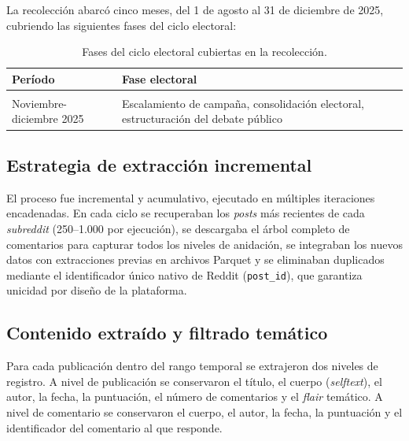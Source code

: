 \documentclass[
  letterpaper,
  numbers=noendperiod,
  fontsize=11pt,
  DIV=12,
  titlepage=false]{scrreprt}
\begin{document}
La recolección abarcó cinco meses, del 1 de agosto al 31 de diciembre de
2025, cubriendo las siguientes fases del ciclo electoral:

\begin{longtable}[t]{>{\raggedright\arraybackslash}p{5cm}>{\raggedright\arraybackslash}p{5cm}}

\caption{\label{tbl-fases-ciclo-electoral}Fases del ciclo electoral
cubiertas en la recolección.}

\tabularnewline

\toprule
Período & Fase electoral\\
\midrule
\cellcolor{gray!10}{Agosto-octubre 2025} & \cellcolor{gray!10}{Emergencia de candidaturas, posicionamiento inicial, primeras definiciones programáticas}\\
Noviembre-diciembre 2025 & Escalamiento de campaña, consolidación electoral, estructuración del debate público\\
\bottomrule

\end{longtable}

\subsection{Estrategia de extracción
incremental}\label{estrategia-de-extracciuxf3n-incremental}

El proceso fue incremental y acumulativo, ejecutado en múltiples
iteraciones encadenadas. En cada ciclo se recuperaban los \emph{posts}
más recientes de cada \emph{subreddit} (250--1.000 por ejecución), se
descargaba el árbol completo de comentarios para capturar todos los
niveles de anidación, se integraban los nuevos datos con extracciones
previas en archivos Parquet y se eliminaban duplicados mediante el
identificador único nativo de Reddit (\texttt{post\_id}), que garantiza
unicidad por diseño de la plataforma.

\subsection{Contenido extraído y filtrado
temático}\label{contenido-extrauxeddo-y-filtrado-temuxe1tico}

Para cada publicación dentro del rango temporal se extrajeron dos
niveles de registro. A nivel de publicación se conservaron el título, el
cuerpo (\emph{selftext}), el autor, la fecha, la puntuación, el número
de comentarios y el \emph{flair} temático. A nivel de comentario se
conservaron el cuerpo, el autor, la fecha, la puntuación y el
identificador del comentario al que responde.
\end{document}
